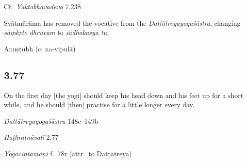 \begin{ekdosis}
\begin{testimonia}[hp03_076]
Cf.~\emph{Yuktabhavadeva} 7.238
\begin{versinnote}
\end{versinnote}
\end{testimonia}

\begin{philcomm}[hp03_076]
Svātmārāma has removed the vocative from the \emph{Dattātreyayogaśāstra}, changing \emph{sāṃkṛte dhruvam} to \emph{sādhakasya tu}.
\end{philcomm}

\begin{metre}[hp03_076]
Anuṣṭubh (c: na-vipulā)
\end{metre}

\subsection*{3.77}
\begin{translation}[hp03_077]
On the first day [the yogi] should keep his head down and his feet up for a short while, and he should [then] practise for a little longer every day.
\end{translation}

\begin{sources}[hp03_077]
\emph{Dattātreyayogaśāstra} 148c–149b
\begin{versinnote}
\end{versinnote}
\end{sources}

\begin{testimonia}[hp03_077]
\emph{Haṭhratnāvalī} 2.77
\begin{versinnote}
\tl{\var{cordhvapādau ] cordhvapādaḥ \vl}\\!}
\end{versinnote}

\emph{Yogacintāmaṇi} f.~78r (attr.~to Dattātreya)
\begin{versinnote}
\end{versinnote}


\end{testimonia}
\end{ekdosis}
